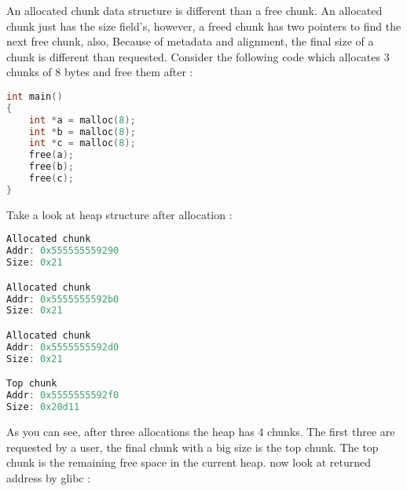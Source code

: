 \documentclass{masterthesis}
\newcommand*\libc{glibc}
\begin{document}
An allocated chunk data structure is different than a free chunk. An allocated chunk just has the size field's, however, a freed chunk has two pointers to find the next free chunk, also, Because of metadata and alignment, the final size of a chunk is different than requested. Consider the following code which allocates 3 chunks of 8 bytes and free them after :

\begin{lstlisting}[language=c]
int main()
{
	int *a = malloc(8);
	int *b = malloc(8);
	int *c = malloc(8);
	free(a);
	free(b);
	free(c);
}
\end{lstlisting}

Take a look at heap structure after allocation : 

\begin{lstlisting}[language=c]
Allocated chunk
Addr: 0x555555559290
Size: 0x21

Allocated chunk
Addr: 0x5555555592b0
Size: 0x21

Allocated chunk
Addr: 0x5555555592d0
Size: 0x21

Top chunk 
Addr: 0x5555555592f0
Size: 0x20d11
\end{lstlisting}

As you can see, after three allocations the heap has 4 chunks. The first three are requested by a user, the final chunk with a big size is the top chunk. The top chunk is the remaining free space in the current heap. now look at returned address by \libc{} :
\end{document}
